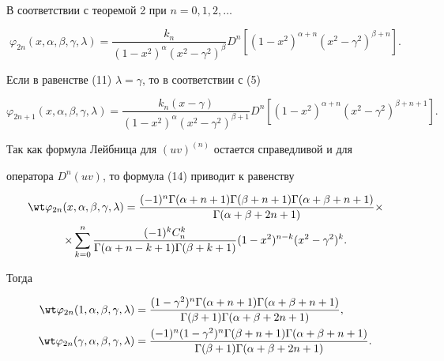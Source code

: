 В соответствии с теоремой 2 при $n=0,1,2,\dotsc$ 


\begin{equation} 


\varphi_{2n}(x,\alpha,\beta,\gamma,\lambda)= 


\frac{k_n}{(1-x^2)^\alpha(x^2-\gamma^2)^\beta} 


D^n[(1-x^2)^{\alpha+n}(x^2-\gamma^2)^{\beta+n}]. 


\end{equation} 


Если в равенстве (11)\; $\lambda=\gamma$, то в соответствии с (5) 


$$ 


\varphi_{2n+1}(x,\alpha,\beta,\gamma,\lambda)= 


\frac{k_n(x-\gamma)}{(1-x^2)^\alpha(x^2-\gamma^2)^{\beta+1}} 


D^n[(1-x^2)^{\alpha+n}(x^2-\gamma^2)^{\beta+n+1}]. 


$$ 


 


Так как формула Лейбница для $(uv)^{(n)}$ остается справедливой и для 


оператора $D^n(uv)$, то формула (14) приводит к равенству 


\begin{multline*} 


\wt\varphi_{2n}(x,\alpha,\beta,\gamma,\lambda)= 


\frac{(-1)^n\Gamma(\alpha+n+1)\Gamma(\beta+n+1) 


\Gamma(\alpha+\beta+n+1)} 


{\Gamma(\alpha+\beta+2n+1)}\times \\ 


% 


\times\sum^n_{k=0} 


\frac{(-1)^k C^k_n}{\Gamma(\alpha+n-k+1)\Gamma(\beta+k+1)} 


(1-x^2)^{n-k}(x^2-\gamma^2)^k. 


\end{multline*} 


Тогда 


\begin{equation} 


\begin{split} 


\wt\varphi_{2n}(1,\alpha,\beta,\gamma,\lambda)&= 


\frac{(1-\gamma^2)^n\Gamma(\alpha+n+1)\Gamma(\alpha+\beta+n+1)} 


{\Gamma(\beta+1)\Gamma(\alpha+\beta+2n+1)},\\ 


\wt\varphi_{2n}(\gamma,\alpha,\beta,\gamma,\lambda)&= 


\frac{(-1)^n(1-\gamma^2)^n\Gamma(\beta+n+1)\Gamma(\alpha+\beta+n+1)} 


{\Gamma(\beta+1)\Gamma(\alpha+\beta+2n+1)}. 


\end{split} 


\end{equation} 


